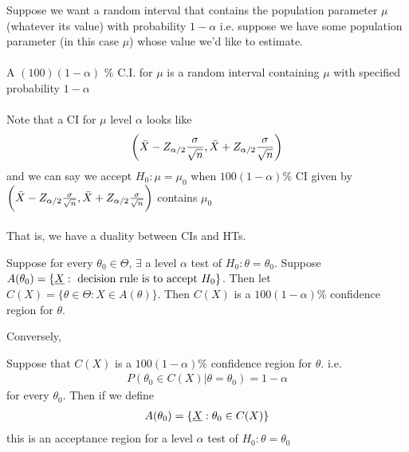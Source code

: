 Suppose we want a random interval that contains the population parameter $\mu$ (whatever its value) with probability $1 - \alpha$ i.e. suppose we have some population parameter (in this case $\mu$) whose value we'd like to estimate.\\\\
A $(100)(1-\alpha)$ \% C.I. for $\mu$ is a random interval containing $\mu$ with specified probability $1-\alpha$\\\\
Note that a CI for $\mu$  level $\alpha$ looks like
\begin{gather*}
	\bigg(\bar{X} - Z_{\alpha / 2} \frac{\sigma}{\sqrt{n}}, \bar{X} + Z_{\alpha / 2} \frac{\sigma}{\sqrt{n}} \bigg)
\end{gather*}
and we can say we accept $H_0: \mu = \mu_0$ when $100(1-\alpha)$\% CI given by $\bigg(\bar{X} - Z_{\alpha / 2} \frac{\sigma}{\sqrt{n}}, \bar{X} + Z_{\alpha / 2} \frac{\sigma}{\sqrt{n}} \bigg)$ contains $\mu_0$\\\\
That is, we have a duality between CIs and HTs.
\begin{theorem}
	Suppose for every $\theta_0 \in \Theta$, $\exists$ a level $\alpha$ test of $H_0: \theta = \theta_0$. Suppose $A(\theta_0) = \{ \underline{X} : \text{ decision rule is to accept $H_0$} \}$. Then let $C(X) = \{ \theta \in \Theta : X \in A(\theta) \}$. Then $C(X)$ is a $100(1 - \alpha)$\% confidence region for $\theta$.
\end{theorem}
Conversely,
\begin{theorem}
	Suppose that $C(X)$ is a $100(1 - \alpha)$\% confidence region for $\theta$. i.e.
	\begin{gather*}
		P ( \theta_0 \in C(X) | \theta = \theta_0 ) = 1 - \alpha
	\end{gather*} for every $\theta_0$. Then if we define 
	\begin{gather*}
		A(\theta_0) = \{ \underline{X} : \theta_0 \in C(X) \}
	\end{gather*}
	this is an acceptance region for a level $\alpha$ test of $H_0: \theta = \theta_0$
\end{theorem}
